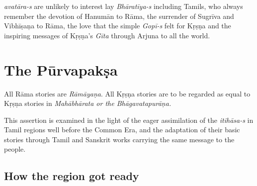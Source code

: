 \textit{avatāra-s} are unlikely to interest lay \textit{Bhāratīya-s} including Tamils, who always remember the devotion of Hanumān to Rāma, the surrender of Sugrīva and Vibhīṣaņa to Rāma, the love that the simple \textit{Gopī-s} felt for Kṛṣṇa and the inspiring messages of Kṛṣṇa’s \textit{Gīta} through Arjuna to all the world.


\section*{The Pūrvapakṣa}

All Rāma stories are \textit{Rāmāyaṇa}. All Kṛṣṇa stories are to be regarded as equal to Kṛṣṇa stories in \textit{Mahābhārata or the Bhāgavatapurāṇa.}

This assertion is examined in the light of the eager assimilation of the \textit{itihāsa-s} in Tamil regions well before the Common Era, and the adaptation of their basic stories through Tamil and Sanskrit works carrying the same message to the people.

\subsection*{How the region got ready}

